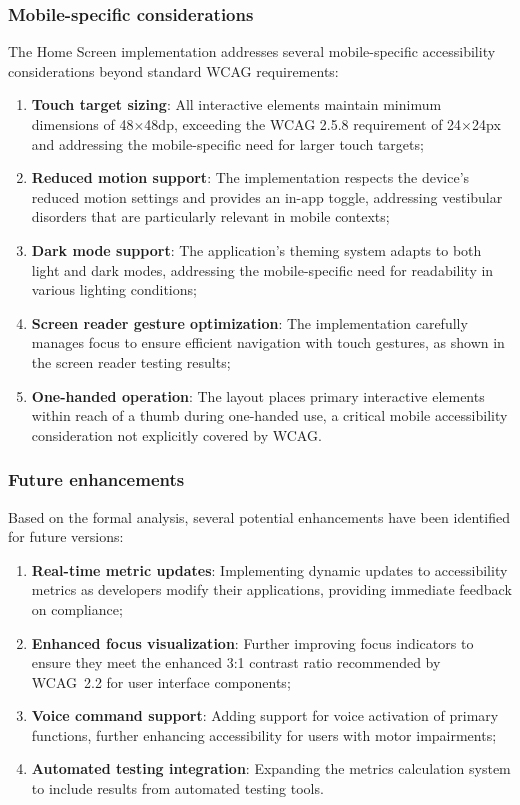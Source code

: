 \subsubsection{Mobile-specific considerations}

The Home Screen implementation addresses several mobile-specific accessibility considerations beyond standard WCAG requirements:

\begin{enumerate}
    \item \textbf{Touch target sizing}: All interactive elements maintain minimum dimensions of 48$\times$48dp, exceeding the WCAG 2.5.8 requirement of 24$\times$24px and addressing the mobile-specific need for larger touch targets;
    \item \textbf{Reduced motion support}: The implementation respects the device's reduced motion settings and provides an in-app toggle, addressing vestibular disorders that are particularly relevant in mobile contexts;
    \item \textbf{Dark mode support}: The application's theming system adapts to both light and dark modes, addressing the mobile-specific need for readability in various lighting conditions;
    \item \textbf{Screen reader gesture optimization}: The implementation carefully manages focus to ensure efficient navigation with touch gestures, as shown in the screen reader testing results;
    \item \textbf{One-handed operation}: The layout places primary interactive elements within reach of a thumb during one-handed use, a critical mobile accessibility consideration not explicitly covered by WCAG.
\end{enumerate}

\subsubsection{Future enhancements}

Based on the formal analysis, several potential enhancements have been identified for future versions:
\begin{enumerate}
    \item \textbf{Real-time metric updates}: Implementing dynamic updates to accessibility metrics as developers modify their applications, providing immediate feedback on compliance;
    \item \textbf{Enhanced focus visualization}: Further improving focus indicators to ensure they meet the enhanced 3:1 contrast ratio recommended by WCAG~2.2 for user interface components;
    \item \textbf{Voice command support}: Adding support for voice activation of primary functions, further enhancing accessibility for users with motor impairments;
    \item \textbf{Automated testing integration}: Expanding the metrics calculation system to include results from automated testing tools.
\end{enumerate}

